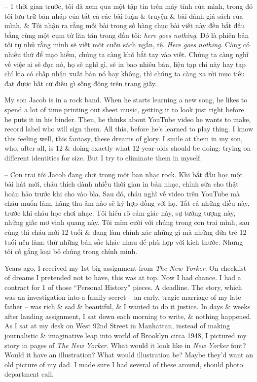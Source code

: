 \documentclass{article}
\begin{document}
\begin{itemize}
	-- 1 thời gian trước, tôi đã xem qua một tập tin trên máy tính của mình, trong đó tôi lưu trữ bản nháp của tất cả các bài luận \& truyện \& bài đánh giá sách của mình, \& Tôi nhận ra rằng mỗi bài trong số hàng chục bài viết này đều bắt đầu bằng cùng một cụm từ lăn tăn trong đầu tôi: {\it here goes nothing}. Đó là phiên bản tôi tự nhủ rằng mình sẽ viết một cuốn sách ngắn, tệ. {\it Here goes nothing}. Càng có nhiều thứ để mạo hiểm, chúng ta càng khó bắt tay vào viết. Chúng ta càng nghĩ về việc ai sẽ đọc nó, họ sẽ nghĩ gì, sẽ in bao nhiêu bản, liệu tạp chí này hay tạp chí kia có chấp nhận xuất bản nó hay không, thì chúng ta càng xa rời mục tiêu đạt được bất cứ điều gì sống động trên trang giấy.
	
	My son {\sc Jacob} is in a rock band. When he starts learning a new song, he likes to spend a lot of time printing out sheet music, getting it to look just right before he puts it in his binder. Then, he thinks about YouTube video he wants to make, record label who will sign them. All this, before he's learned to play thing. I know this feeling well, this fantasy, these dreams of glory. I smile at them in my son, who, after all, is 12 \& doing exactly what 12-year-olds should be doing: trying on different identities for size. But I try to eliminate them in myself.
	
	-- Con trai tôi {\sc Jacob} đang chơi trong một ban nhạc rock. Khi bắt đầu học một bài hát mới, cháu thích dành nhiều thời gian in bản nhạc, chỉnh sửa cho thật hoàn hảo trước khi cho vào bìa. Sau đó, cháu nghĩ về video trên YouTube mà cháu muốn làm, hãng thu âm nào sẽ ký hợp đồng với họ. Tất cả những điều này, trước khi cháu học chơi nhạc. Tôi hiểu rõ cảm giác này, sự tưởng tượng này, những giấc mơ vinh quang này. Tôi mỉm cười với chúng trong con trai mình, sau cùng thì cháu mới 12 tuổi \& đang làm chính xác những gì mà những đứa trẻ 12 tuổi nên làm: thử những bản sắc khác nhau để phù hợp với kích thước. Nhưng tôi cố gắng loại bỏ chúng trong chính mình.
	
	Years ago, I received my 1st big assignment from {\it The New Yorker}. On checklist of dreams I pretended not to have, this was at top. Now I had chance. I had a contract for 1 of those ``Personal History'' pieces. A deadline. The story, which was an investigation into a family secret -- an early, tragic marriage of my late father -- was rich \& sad \& beautiful, \& I wanted to do it justice. In days \& weeks after landing assignment, I sat down each morning to write, \& nothing happened. As I sat at my desk on West 92nd Street in Manhattan, instead of making journalistic \& imaginative leap into world of Brooklyn circa 1948, I pictured my story in pages of {\it The New Yorker}. What would it look like in {\it New Yorker} font? Would it have an illustration? What would illustration be? Maybe they'd want an old picture of my dad. I made sure I had several of these around, should photo department call.


\end{itemize}
\end{document}
